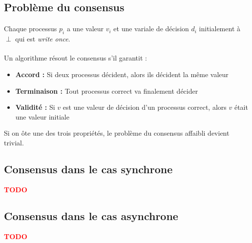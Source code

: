 \documentclass[french]{article}
\newcommand{\TODO}{\textcolor{red}{\textbf{TODO}}}
\begin{document}
\subsection{Problème du consensus}

\paragraph{}Chaque processus $p_i$ a une valeur $v_i$ et une variale de décision $d_i$ initialement à $\perp$ qui est \emph{write once}.

\paragraph{}Un algorithme résout le consensus s'il garantit :
\begin{itemize}
	\item \textbf{Accord :} Si deux processus décident, alors ils décident la même valeur
	\item \textbf{Terminaison :} Tout processus correct va finalement décider
	\item \textbf{Validité :} Si $v$ est une valeur de décision d'un processus correct, alors $v$ était une valeur initiale
\end{itemize}

Si on ôte une des trois propriétés, le problème du consensus affaibli devient trivial.

\subsection{Consensus dans le cas synchrone}

\TODO

\subsection{Consensus dans le cas asynchrone}

\TODO
\end{document}
